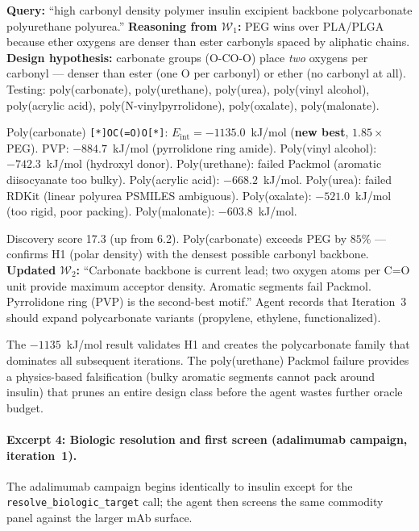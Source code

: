 \documentclass[twocolumn]{fairmeta}
\begin{document}
\begin{agentthought}
\scriptsize
\textbf{Query:} ``high carbonyl density polymer insulin excipient backbone polycarbonate polyurethane polyurea.''
\textbf{Reasoning from $\mathcal{W}_1$:} PEG wins over PLA/PLGA because ether oxygens are denser than ester carbonyls spaced by aliphatic chains.
\textbf{Design hypothesis:} carbonate groups (O-CO-O) place \emph{two} oxygens per carbonyl --- denser than ester (one O per carbonyl) or ether (no carbonyl at all).
Testing: poly(carbonate), poly(urethane), poly(urea), poly(vinyl alcohol), poly(acrylic acid), poly(N-vinylpyrrolidone), poly(oxalate), poly(malonate).
\end{agentthought}

\begin{toolcall}
\scriptsize
Poly(carbonate) \texttt{[*]OC(=O)O[*]}: $E_\text{int} = -1135.0$~kJ/mol (\textbf{new best}, $1.85\times$ PEG).
PVP: $-884.7$~kJ/mol (pyrrolidone ring amide).
Poly(vinyl alcohol): $-742.3$~kJ/mol (hydroxyl donor).
Poly(urethane): failed Packmol (aromatic diisocyanate too bulky).
Poly(acrylic acid): $-668.2$~kJ/mol.
Poly(urea): failed RDKit (linear polyurea PSMILES ambiguous).
Poly(oxalate): $-521.0$~kJ/mol (too rigid, poor packing).
Poly(malonate): $-603.8$~kJ/mol.
\end{toolcall}

\begin{observation}
\scriptsize
Discovery score 17.3 (up from 6.2).
Poly(carbonate) exceeds PEG by $85\%$ --- confirms H1 (polar density) with the densest possible carbonyl backbone.
\textbf{Updated $\mathcal{W}_2$:} ``Carbonate backbone is current lead; two oxygen atoms per C=O unit provide maximum acceptor density.
Aromatic segments fail Packmol.
Pyrrolidone ring (PVP) is the second-best motif.''
Agent records that Iteration~3 should expand polycarbonate variants (propylene, ethylene, functionalized).
\end{observation}

\noindent The $-1135$~kJ/mol result validates H1 and creates the polycarbonate family that dominates all subsequent iterations.
The poly(urethane) Packmol failure provides a physics-based falsification (bulky aromatic segments cannot pack around insulin) that prunes an entire design class before the agent wastes further oracle budget.

\paragraph{Excerpt 4: Biologic resolution and first screen (adalimumab campaign, iteration~1).}
The adalimumab campaign begins identically to insulin except for the \texttt{resolve\_biologic\_target} call; the agent then screens the same commodity panel against the larger mAb surface.
\end{document}
